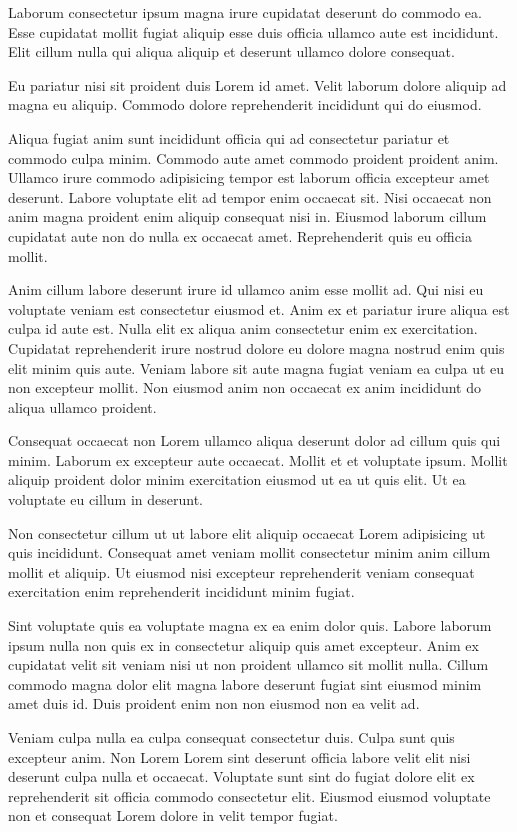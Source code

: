 \documentclass{article}
\begin{document}
Laborum consectetur ipsum magna irure cupidatat deserunt do commodo ea. Esse cupidatat mollit fugiat aliquip esse duis officia ullamco aute est incididunt. Elit cillum nulla qui aliqua aliquip et deserunt ullamco dolore consequat.

Eu pariatur nisi sit proident duis Lorem id amet. Velit laborum dolore aliquip ad magna eu aliquip. Commodo dolore reprehenderit incididunt qui do eiusmod.

Aliqua fugiat anim sunt incididunt officia qui ad consectetur pariatur et commodo culpa minim. Commodo aute amet commodo proident proident anim. Ullamco irure commodo adipisicing tempor est laborum officia excepteur amet deserunt. Labore voluptate elit ad tempor enim occaecat sit. Nisi occaecat non anim magna proident enim aliquip consequat nisi in. Eiusmod laborum cillum cupidatat aute non do nulla ex occaecat amet. Reprehenderit quis eu officia mollit.

Anim cillum labore deserunt irure id ullamco anim esse mollit ad. Qui nisi eu voluptate veniam est consectetur eiusmod et. Anim ex et pariatur irure aliqua est culpa id aute est. Nulla elit ex aliqua anim consectetur enim ex exercitation. Cupidatat reprehenderit irure nostrud dolore eu dolore magna nostrud enim quis elit minim quis aute. Veniam labore sit aute magna fugiat veniam ea culpa ut eu non excepteur mollit. Non eiusmod anim non occaecat ex anim incididunt do aliqua ullamco proident.

Consequat occaecat non Lorem ullamco aliqua deserunt dolor ad cillum quis qui minim. Laborum ex excepteur aute occaecat. Mollit et et voluptate ipsum. Mollit aliquip proident dolor minim exercitation eiusmod ut ea ut quis elit. Ut ea voluptate eu cillum in deserunt.

Non consectetur cillum ut ut labore elit aliquip occaecat Lorem adipisicing ut quis incididunt. Consequat amet veniam mollit consectetur minim anim cillum mollit et aliquip. Ut eiusmod nisi excepteur reprehenderit veniam consequat exercitation enim reprehenderit incididunt minim fugiat.

Sint voluptate quis ea voluptate magna ex ea enim dolor quis. Labore laborum ipsum nulla non quis ex in consectetur aliquip quis amet excepteur. Anim ex cupidatat velit sit veniam nisi ut non proident ullamco sit mollit nulla. Cillum commodo magna dolor elit magna labore deserunt fugiat sint eiusmod minim amet duis id. Duis proident enim non non eiusmod non ea velit ad.

Veniam culpa nulla ea culpa consequat consectetur duis. Culpa sunt quis excepteur anim. Non Lorem Lorem sint deserunt officia labore velit elit nisi deserunt culpa nulla et occaecat. Voluptate sunt sint do fugiat dolore elit ex reprehenderit sit officia commodo consectetur elit. Eiusmod eiusmod voluptate non et consequat Lorem dolore in velit tempor fugiat.
\end{document}

